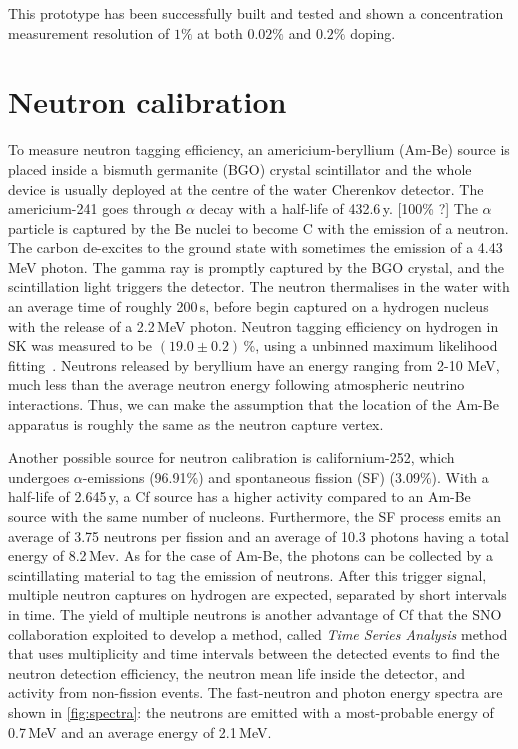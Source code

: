 This prototype has been successfully built and tested and shown a concentration measurement %
resolution of $1\%$ at both $0.02\%$ and $0.2\%$ doping.


\section{Neutron calibration}


To measure neutron tagging efficiency, an americium-beryllium (Am-Be) source is placed inside
a bismuth germanite (BGO) crystal scintillator and the whole device is usually deployed %
at the centre of the water Cherenkov detector.
The americium-241 goes through $\alpha$ decay with a half-life of 432.6\,y. [100\% ?]
The $\alpha$ particle is captured by the Be nuclei to become C\tapi{*} with the emission of a neutron.
The carbon de-excites to the ground state with sometimes the emission of a 4.43\,MeV photon.
The gamma ray is promptly captured by the BGO crystal, and the scintillation light triggers the detector.
The neutron thermalises in the water with an average time of roughly 200\,\textmu s, %
before begin captured on a hydrogen nucleus with the release of a 2.2\,MeV photon.
Neutron tagging efficiency on hydrogen in SK was measured to be $(19.0\pm0.2)$\,\%, %
using a unbinned maximum likelihood fitting~\cite{}.
Neutrons released by beryllium have an energy ranging from 2-10 MeV, %
much less than the average neutron energy following atmospheric neutrino interactions.
Thus, we can make the assumption that the location of the Am-Be apparatus is roughly the same %
as the neutron capture vertex.


Another possible source for neutron calibration is californium-252, which %
undergoes $\alpha$-emissions (96.91\%) and spontaneous fission (SF) (3.09\%).
With a half-life of 2.645\,y, a Cf source has a higher activity compared to an Am-Be source %
with the same number of nucleons.
Furthermore, the SF process emits an average of 3.75 neutrons per fission and an average of 10.3 photons %
having a total energy of 8.2\,Mev.
As for the case of Am-Be, the photons can be collected by a scintillating material to tag the %
emission of neutrons.
After this trigger signal, multiple neutron captures on hydrogen are expected, %
separated by short intervals in time.
The yield of multiple neutrons is another advantage of Cf that %
the SNO collaboration exploited to develop a method, called \emph{Time Series Analysis} method that uses %
multiplicity and time intervals between the detected events %
to find the neutron detection efficiency, the neutron mean life inside the detector, %
and activity from non-fission events.
The fast-neutron and photon energy spectra are shown in \ref{fig:spectra}: %
the neutrons are emitted with a most-probable energy of 0.7\,MeV and an average energy of 2.1\,MeV.

